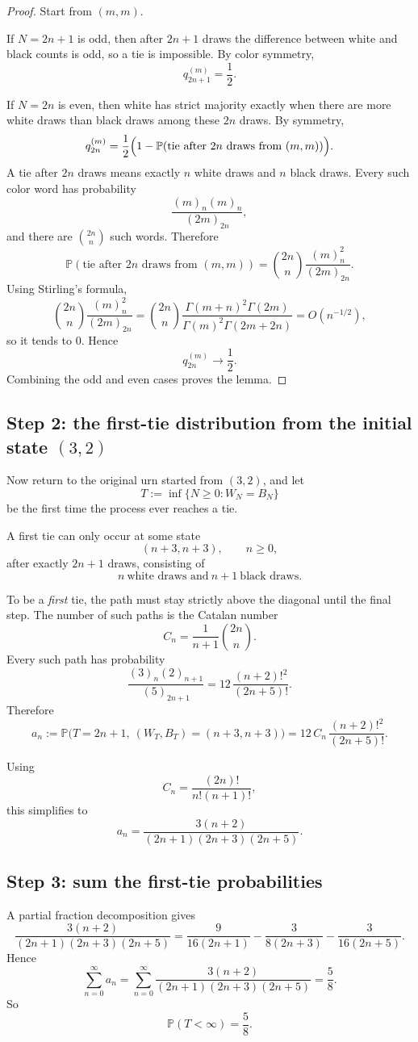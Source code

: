 \documentclass[12pt]{article}
\begin{document}
\begin{proof}
Start from $(m,m)$.

If $N=2n+1$ is odd, then after $2n+1$ draws the difference between white and black counts is odd, so a tie is impossible. By color symmetry,
\[
q_{2n+1}^{(m)}=\frac12.
\]

If $N=2n$ is even, then white has strict majority exactly when there are more white draws than black draws among these $2n$ draws. By symmetry,
\[
q_{2n}^{(m)}
=
\frac12\Bigl(1-\mathbb{P}(\text{tie after }2n\text{ draws from }(m,m))\Bigr).
\]
A tie after $2n$ draws means exactly $n$ white draws and $n$ black draws. Every such color word has probability
\[
\frac{(m)_n(m)_n}{(2m)_{2n}},
\]
and there are $\binom{2n}{n}$ such words. Therefore
\[
\mathbb{P}(\text{tie after }2n\text{ draws from }(m,m))
=
\binom{2n}{n}\frac{(m)_n^2}{(2m)_{2n}}.
\]
Using Stirling's formula,
\[
\binom{2n}{n}\frac{(m)_n^2}{(2m)_{2n}}
=
\binom{2n}{n}
\frac{\Gamma(m+n)^2\Gamma(2m)}{\Gamma(m)^2\Gamma(2m+2n)}
=
O(n^{-1/2}),
\]
so it tends to $0$. Hence
\[
q_{2n}^{(m)}\longrightarrow \frac12.
\]
Combining the odd and even cases proves the lemma.
\end{proof}

\subsection*{Step 2: the first-tie distribution from the initial state $(3,2)$}

Now return to the original urn started from $(3,2)$, and let
\[
T:=\inf\{N\ge 0: W_N=B_N\}
\]
be the first time the process ever reaches a tie.

A first tie can only occur at some state
\[
(n+3,n+3),\qquad n\ge 0,
\]
after exactly $2n+1$ draws, consisting of
\[
n\ \text{white draws and}\ n+1\ \text{black draws}.
\]

To be a \emph{first} tie, the path must stay strictly above the diagonal until the final step. The number of such paths is the Catalan number
\[
C_n=\frac{1}{n+1}\binom{2n}{n}.
\]
Every such path has probability
\[
\frac{(3)_n(2)_{n+1}}{(5)_{2n+1}}
=
12\,\frac{(n+2)!^2}{(2n+5)!}.
\]
Therefore
\[
a_n:=\mathbb{P}\bigl(T=2n+1,\ (W_T,B_T)=(n+3,n+3)\bigr)
=
12\,C_n\,\frac{(n+2)!^2}{(2n+5)!}.
\]

Using
\[
C_n=\frac{(2n)!}{n!(n+1)!},
\]
this simplifies to
\[
a_n
=
\frac{3(n+2)}{(2n+1)(2n+3)(2n+5)}.
\]

\subsection*{Step 3: sum the first-tie probabilities}
A partial fraction decomposition gives
\[
\frac{3(n+2)}{(2n+1)(2n+3)(2n+5)}
=
\frac{9}{16(2n+1)}-\frac{3}{8(2n+3)}-\frac{3}{16(2n+5)}.
\]
Hence
\[
\sum_{n=0}^{\infty} a_n
=
\sum_{n=0}^{\infty}
\frac{3(n+2)}{(2n+1)(2n+3)(2n+5)}
=
\frac58.
\]
So
\[
\mathbb{P}(T<\infty)=\frac58.
\]
\end{document}
